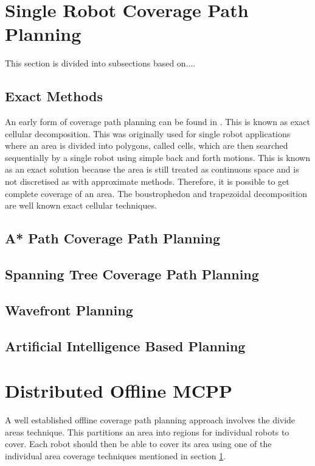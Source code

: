 \section{Single Robot Coverage Path Planning}
\label{sec:lit SR CPP}
This section is divided into subsections based on....
\subsection{Exact Methods}
\label{sec:lit SR CPP - Exact}
An early form of coverage path planning can be found in \cite{Choset2001}. This is known as exact cellular decomposition. This was originally used for single robot applications where an area is divided into polygons, called cells, which are then searched sequentially by a single robot using simple back and forth motions. This is known as an exact solution because the area is still treated as continuous space and is not discretised as with approximate methods. Therefore, it is possible to get complete coverage of an area. The boustrophedon and trapezoidal decomposition are well known exact cellular techniques.\\
\subsection{A* Path Coverage Path Planning}
\subsection{Spanning Tree Coverage Path Planning}
\label{sec:lit SR CPP - STC}

\subsection{Wavefront Planning}
\subsection{Artificial Intelligence Based Planning}

\section{Distributed Offline MCPP}
\label{sec:lit Ditributed MCPP}
A well established offline coverage path planning approach involves the divide areas technique. This partitions an area into regions for individual robots to cover. Each robot should then be able to cover its area using one of the individual area coverage techniques mentioned in section \ref{sec:lit SR CPP}.

